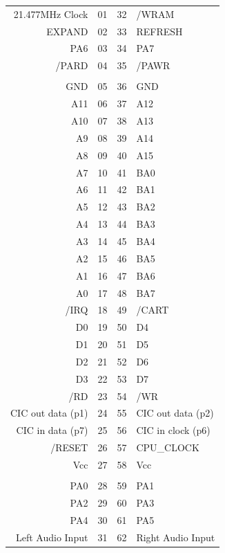 \documentclass[paper=a4, fontsize=11pt]{scrartcl}	%
\numberwithin{equation}{section}															%
\numberwithin{figure}{section}																%
\numberwithin{table}{section}																%
\begin{document}
\begin{tabular}{rlrl}
21.477MHz Clock  & 01  & 32  & /WRAM\\
EXPAND  & 02  & 33  & REFRESH\\
PA6  & 03  & 34  & PA7  \\
/PARD  & 04  & 35  & /PAWR\\
&     &     &      \\
GND  & 05  & 36  & GND  \\
A11  & 06  & 37  & A12  \\
A10  & 07  & 38  & A13  \\
A9  & 08  & 39  & A14  \\
A8  & 09  & 40  & A15  \\
A7  & 10  & 41  & BA0  \\
A6  & 11  & 42  & BA1  \\
A5  & 12  & 43  & BA2  \\
A4  & 13  & 44  & BA3  \\
A3  & 14  & 45  & BA4  \\
A2  & 15  & 46  & BA5  \\
A1  & 16  & 47  & BA6  \\
A0  & 17  & 48  & BA7  \\
/IRQ  & 18  & 49  & /CART\\
D0  & 19  & 50  & D4   \\
D1  & 20  & 51  & D5   \\
D2  & 21  & 52  & D6   \\
D3  & 22  & 53  & D7   \\
/RD  & 23  & 54  & /WR  \\
CIC out data (p1)  & 24  & 55  & CIC out data (p2)\\
CIC  in data (p7)  & 25  & 56  & CIC in clock (p6)\\
/RESET  & 26  & 57  & CPU\_CLOCK\\
Vcc  & 27  & 58  & Vcc  \\
&     &     &      \\
PA0  & 28  & 59  & PA1  \\
PA2  & 29  & 60  & PA3  \\
PA4  & 30  & 61  & PA5  \\
Left Audio Input  & 31  & 62  & Right Audio Input\\

\end{tabular}
 
\end{document}
